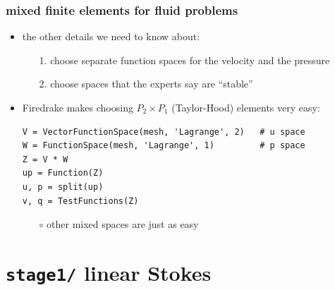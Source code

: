 \documentclass[10pt,
               hyperref={colorlinks,citecolor=DeepPink4,linkcolor=black,urlcolor=blue},
               svgnames]{beamer}
\begin{document}
\begin{frame}[fragile]
\frametitle{mixed finite elements for fluid problems}

\begin{itemize}
\item the other details we need to know about:
    \begin{itemize}
    \item[{\color{black} 1.}] \alert{choose separate function spaces for the velocity and the pressure}
    \item[{\color{black} 2.}] \alert{choose spaces that the experts say are ``stable''}
    \end{itemize}

\bigskip
\item Firedrake makes choosing $P_2 \times P_1$ (Taylor-Hood) elements very easy:

\medskip
\begin{Verbatim}[fontsize=\small]
V = VectorFunctionSpace(mesh, 'Lagrange', 2)   # u space
W = FunctionSpace(mesh, 'Lagrange', 1)         # p space
Z = V * W
up = Function(Z)
u, p = split(up)
v, q = TestFunctions(Z)
\end{Verbatim}

\medskip
    \begin{itemize}
    \item[$\circ$] other mixed spaces are just as easy
    \end{itemize}
\end{itemize}
\end{frame}



\section{\texttt{stage1/} \qquad linear Stokes}
\end{document}

